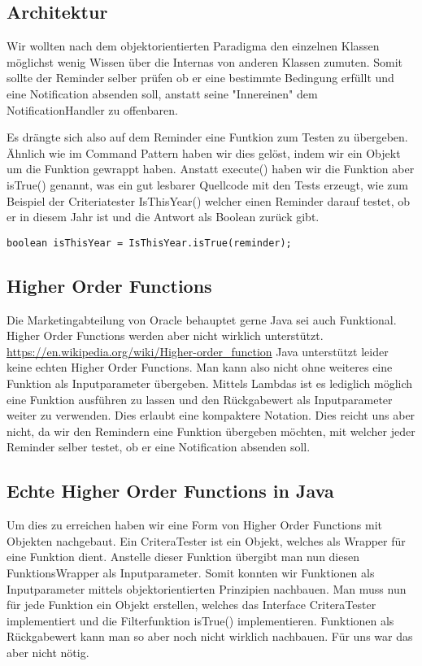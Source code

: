 \subsection{Architektur}
Wir wollten nach dem objektorientierten Paradigma den einzelnen Klassen möglichst wenig Wissen über die Internas von anderen Klassen zumuten.
Somit sollte der Reminder selber prüfen ob er eine bestimmte Bedingung erfüllt und eine Notification absenden soll, anstatt seine "Innereinen" dem NotificationHandler zu offenbaren.

Es drängte sich also auf dem Reminder eine Funtkion zum Testen zu übergeben. Ähnlich wie im Command Pattern haben wir dies gelöst, indem wir ein Objekt um die Funktion gewrappt
haben. Anstatt execute() haben wir die Funktion aber isTrue() genannt, was ein gut lesbarer Quellcode mit den Tests erzeugt,
wie zum Beispiel der Criteriatester IsThisYear() welcher einen Reminder darauf testet, ob er in diesem Jahr ist und die Antwort als Boolean zurück gibt.
\begin{lstlisting}
boolean isThisYear = IsThisYear.isTrue(reminder);
\end{lstlisting}
\subsection{ Higher Order Functions}
  Die Marketingabteilung von Oracle behauptet gerne Java sei auch Funktional. Higher Order Functions werden aber nicht wirklich unterstützt.
  \url{https://en.wikipedia.org/wiki/Higher-order_function}
  Java unterstützt leider keine echten Higher Order Functions. Man kann also nicht ohne weiteres eine Funktion als Inputparameter übergeben.
  Mittels Lambdas ist es lediglich möglich eine Funktion ausführen zu lassen und den Rückgabewert als Inputparameter weiter zu verwenden. Dies erlaubt eine kompaktere
  Notation. Dies reicht uns aber nicht, da wir den Remindern eine Funktion übergeben möchten, mit welcher jeder Reminder selber testet, ob er eine Notification absenden soll.

  \subsection{Echte Higher Order Functions in Java}
  Um dies zu erreichen haben wir eine Form von Higher Order Functions mit Objekten nachgebaut.
  Ein CriteraTester ist ein Objekt, welches als Wrapper für eine Funktion dient. Anstelle dieser Funktion übergibt man nun diesen FunktionsWrapper als Inputparameter. Somit
  konnten wir Funktionen als Inputparameter mittels objektorientierten Prinzipien nachbauen.
  Man muss nun für jede Funktion ein Objekt erstellen, welches das Interface CriteraTester implementiert und die Filterfunktion isTrue() implementieren.
  Funktionen als Rückgabewert kann man so aber noch nicht wirklich nachbauen. Für uns war das aber nicht nötig.

